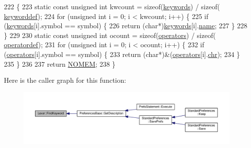 \begin{DoxyCode}
222 \{
223     \textcolor{keyword}{static} \textcolor{keyword}{const} \textcolor{keywordtype}{unsigned} \textcolor{keywordtype}{int} kwcount = \textcolor{keyword}{sizeof}(\hyperlink{kword_8h_ae24629a120e041e6b687315832fca587}{keywords}) / \textcolor{keyword}{sizeof}(
      \hyperlink{structkeyworddef}{keyworddef});
224     \textcolor{keywordflow}{for} (\textcolor{keywordtype}{unsigned} \textcolor{keywordtype}{int} i = 0; i < kwcount; i++) \{
225         \textcolor{keywordflow}{if} (\hyperlink{kword_8h_ae24629a120e041e6b687315832fca587}{keywords}[i].symbol == symbol) \{
226             \textcolor{keywordflow}{return} (\textcolor{keywordtype}{char}*)\hyperlink{kword_8h_ae24629a120e041e6b687315832fca587}{keywords}[i].\hyperlink{structkeyworddef_a03b3d7dd316565c6fac8786186ec66c2}{name};
227         \}
228     \}
229 
230     \textcolor{keyword}{static} \textcolor{keyword}{const} \textcolor{keywordtype}{unsigned} \textcolor{keywordtype}{int} ocount = \textcolor{keyword}{sizeof}(\hyperlink{lex_8h_aaa2a2d46273713612114ac54f424c653}{operators}) / \textcolor{keyword}{sizeof}(
      \hyperlink{structoperatordef}{operatordef});
231     \textcolor{keywordflow}{for} (\textcolor{keywordtype}{unsigned} \textcolor{keywordtype}{int} i = 0; i < ocount; i++) \{
232         \textcolor{keywordflow}{if} (\hyperlink{lex_8h_aaa2a2d46273713612114ac54f424c653}{operators}[i].symbol == symbol) \{
233             \textcolor{keywordflow}{return} (\textcolor{keywordtype}{char}*)&(\hyperlink{lex_8h_aaa2a2d46273713612114ac54f424c653}{operators}[i].\hyperlink{structoperatordef_afe0e7e99e83e532bf9d616ed75a133c6}{chr});
234         \}
235     \}
236 
237     \textcolor{keywordflow}{return} \hyperlink{platform_8h_a46ff2bfbf0d44b8466a2251d5bd5e6f8}{NOMEM};
238 \}
\end{DoxyCode}


Here is the caller graph for this function\+:
\nopagebreak
\begin{figure}[H]
\begin{center}
\leavevmode
\includegraphics[width=350pt]{d6/dc0/classLexer_affd4bac61db830383302be71198a372a_icgraph}
\end{center}
\end{figure}


